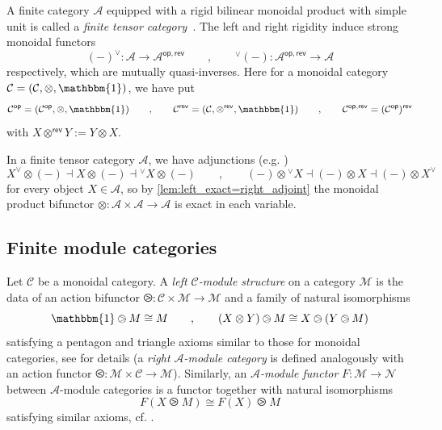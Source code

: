 \documentclass[11pt]{article}
\theoremstyle{definition}
\begin{document}
A finite category $\mathcal{A}$ equipped with a rigid bilinear monoidal  product  with simple unit is called a \emph{finite tensor category}~\cite{etingofostrik}. The left and right rigidity induce strong monoidal functors
\begin{equation}\label{eq:duality_functors}
(-)^\vee: \mathcal{A} \to \mathcal{A}^{\mathsf{op}, \mathsf{rev}}  \qquad , \qquad ^{\vee}(-): \mathcal{A}^{\mathsf{op} , \mathsf{rev}}\to \mathcal{A} 
\end{equation}
respectively, 
which are mutually quasi-inverses. Here for a monoidal category $\mathcal{C} = (\mathcal{C} , \otimes, \mathbbm{1})$, we have put 
$$ \mathcal{C}^{\mathsf{op}} = (\mathcal{C}^{\mathsf{op}}, \otimes, \mathbbm{1})  \qquad , \qquad  \mathcal{C}^{\mathsf{rev}} = (\mathcal{C}, \otimes^{\mathsf{rev}}, \mathbbm{1}) \qquad , \qquad \mathcal{C}^{\mathsf{op}, \mathsf{rev}} = (\mathcal{C} ^{\mathsf{op}})^{\mathsf{rev}} $$ with $
X \otimes^{\mathsf{rev}} Y := Y \otimes X$.


In a finite tensor category $\mathcal{A}$, we have adjunctions (e.g. \cite[\S 2.7]{shimizuunimodular})
\begin{equation}\label{eq:adjunctions_duals_ftc}
X^\vee \otimes(-)\dashv X\otimes(-)\dashv {}^\vee X\otimes(-)\qquad , \qquad (-)\otimes {}^\vee X\dashv(-)\otimes X\dashv(-)\otimes X^\vee 
\end{equation}
for every object $X \in \mathcal{A}$, so by  \cref{lem:left_exact=right_adjoint} the monoidal product bifunctor $\otimes : \mathcal{A} \times \mathcal{A} \to \mathcal{A} $ is exact in each variable.


\subsection{Finite module categories}\label{subsec:finite_mod_cats}

Let $\mathcal{C}$ be a monoidal category. A \emph{left $\mathcal{C}$-module structure} on a category $\mathcal{M}$ is the data of an action bifunctor $\ogreaterthan : \mathcal{C} \times \mathcal{M} \longrightarrow \mathcal{M} $ and a family of natural isomorphisms
$$ \mathbbm{1}\ogreaterthan M \cong M \qquad , \qquad  (X \otimes Y)\ogreaterthan  M \cong X \ogreaterthan (Y \ogreaterthan M)  $$ satisfying a pentagon and triangle axioms similar to those for monoidal categories, see \cite[\S 7.1]{egno} for details (a \emph{right $\mathcal{A}$-module category} is defined analogously with an action functor $\olessthan : \mathcal{M} \times \mathcal{C} \longrightarrow \mathcal{M}$).  Similarly, an \emph{$\mathcal{A}$-module functor} $F: \mathcal{M} \longrightarrow \mathcal{N}$ between $\mathcal{A}$-module categories is a functor together with natural isomorphisms $$ F(X \ogreaterthan M) \cong F(X) \ogreaterthan M   $$ satisfying similar axioms, cf.  \cite[\S 7.2]{egno}.
\end{document}
